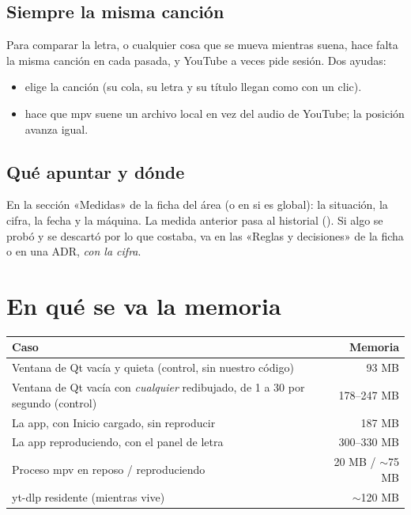 \subsection{Siempre la misma canción}

Para comparar la letra, o cualquier cosa que se mueva mientras suena, hace falta la misma
canción en cada pasada, y YouTube a veces pide sesión. Dos ayudas:

\begin{itemize}
  \item {} elige la canción (su cola, su letra y su título llegan como con un
  clic).
  \item {} hace que mpv suene un archivo local en vez del
  audio de YouTube; la posición avanza igual.
\end{itemize}

\subsection{Qué apuntar y dónde}

En la sección «Medidas» de la ficha del área (o en  si es global): la
situación, la cifra, la fecha y la máquina. La medida anterior pasa al historial
(). Si algo se probó y se descartó por lo que
costaba, va en las «Reglas y decisiones» de la ficha o en una ADR, \emph{con la cifra}.

\section{En qué se va la memoria}

\begin{center}
\small
\begin{tabularx}{\linewidth}{@{}Xr@{}}
\toprule
Caso & Memoria \\
\midrule
Ventana de Qt vacía y quieta (control, sin nuestro código) & 93 MB \\
Ventana de Qt vacía con \emph{cualquier} redibujado, de 1 a 30 por segundo (control) & 178--247 MB \\
La app, con Inicio cargado, sin reproducir & 187 MB \\
La app reproduciendo, con el panel de letra & 300--330 MB \\
Proceso mpv en reposo / reproduciendo & 20 MB / $\sim$75 MB \\
yt-dlp residente (mientras vive) & $\sim$120 MB \\
\bottomrule
\end{tabularx}
\end{center}

